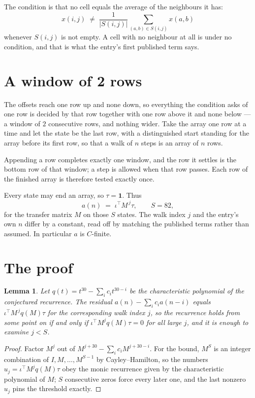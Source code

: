 \documentclass[11pt,a4paper]{article}
\theoremstyle{plain}
\newtheorem{lemma}[theorem]{Lemma}
\theoremstyle{definition}
\begin{document}
The condition is that no cell equals the average of the neighbours it has:
\[
x(i,j)\;\neq\;\frac{1}{|S(i,j)|}\sum_{(a,b)\in S(i,j)}x(a,b)
\]
whenever $S(i,j)$ is not empty. A cell with no neighbour at all is under no condition, and that is what the entry's first published term says.

\section{A window of 2 rows}

The offsets reach one row up and none down, so everything the condition asks of one row is
decided by that row together with one row above it and none below --- a window of
$2$ consecutive rows, and nothing wider. Take the array one row at a time
and let the state be the last row, with a distinguished start standing for the
array before its first row, so that a walk of $n$ steps is an array of $n$ rows.

Appending a row completes exactly one window, and the row it settles is the bottom row of that window; a step is
allowed when that row passes. Each row of the finished
array is therefore tested exactly once.

Every state may end an array, so $\tau=\mathbf{1}$.
Thus
\[
a(n)\;=\;\iota^{\!\top}M^{\,j}\tau ,\qquad S=82,
\]
for the transfer matrix $M$ on those $S$ states. The walk index $j$ and the entry's own $n$
differ by a constant, read off by matching the published terms rather than assumed. In
particular $a$ is $C$-finite.

\section{The proof}

\begin{lemma}\label{lem:crit}
Let $q(t)=t^{30}-\sum_i c_it^{30-i}$ be the characteristic polynomial of the
conjectured recurrence. The residual $a(n)-\sum_ic_ia(n-i)$ equals
$\iota^{\!\top}M^{\,j}q(M)\tau$ for the corresponding walk index $j$, so the recurrence
holds from some point on if and only if $\iota^{\!\top}M^{j}q(M)\tau=0$ for all large $j$,
and it is enough to examine $j<S$.
\end{lemma}

\begin{proof}
Factor $M^{j}$ out of $M^{j+30}-\sum_ic_iM^{j+30-i}$. For the bound, $M^{S}$
is an integer combination of $I,M,\dots,M^{S-1}$ by Cayley--Hamilton, so the numbers
$u_j=\iota^{\!\top}M^{j}q(M)\tau$ obey the monic recurrence given by the characteristic
polynomial of $M$; $S$ consecutive zeros force every later one, and the last nonzero $u_j$
pins the threshold exactly.
\end{proof}
\end{document}
